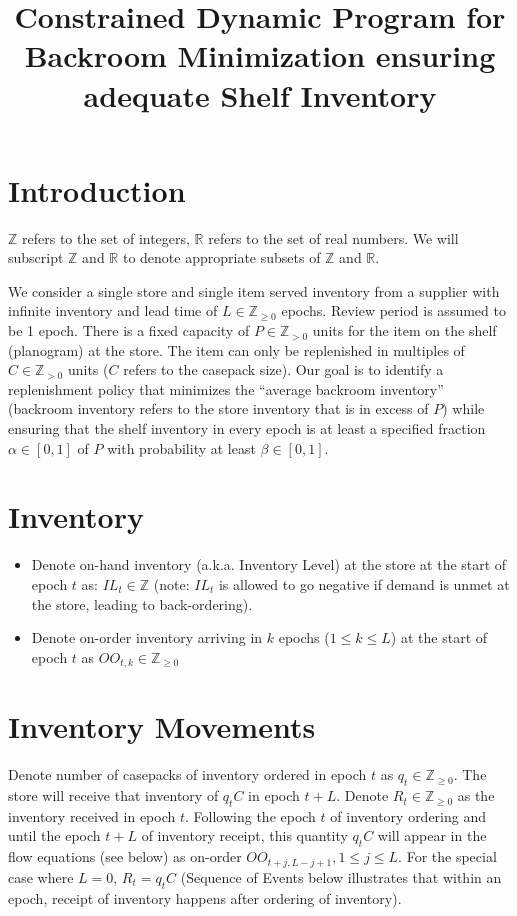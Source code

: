 \documentclass[12pt]{amsart}
\title{Constrained Dynamic Program for Backroom Minimization ensuring adequate Shelf Inventory}
\author{}
\date{} %
\begin{document}
\maketitle

\section{Introduction}

$\mathbb{Z}$ refers to the set of integers, $\mathbb{R}$ refers to the set of real numbers. We will subscript $\mathbb{Z}$ and $\mathbb{R}$ to denote appropriate subsets of $\mathbb{Z}$ and $\mathbb{R}$. 
 
We consider a single store and single item served inventory from a supplier with infinite inventory and lead time of $L \in \mathbb{Z}_{\geq 0}$ epochs. Review period is assumed to be 1 epoch. There is a fixed capacity of $P \in \mathbb{Z}_{> 0}$ units for the item on the shelf (planogram) at the store. The item can only be replenished in multiples of $C \in \mathbb{Z}_{> 0}$ units ($C$ refers to the casepack size). Our goal is to identify a replenishment policy that minimizes the ``average backroom inventory'' (backroom inventory refers to the store inventory that is in excess of $P$) while ensuring that the shelf inventory in every epoch is at least a specified fraction $\alpha \in [0,1]$ of $P$ with probability at least $\beta \in [0,1]$.

\section{Inventory}
\begin{itemize}
\item Denote on-hand inventory (a.k.a. Inventory Level) at the store at the start of epoch $t$ as: $IL_t \in \mathbb{Z}$ (note: $IL_t$ is allowed to go negative if demand is unmet at the store, leading to back-ordering).
\item Denote on-order inventory arriving in $k$ epochs ($1 \leq k \leq L$) at the start of epoch $t$ as $OO_{t,k} \in \mathbb{Z}_{\geq 0}$
\end{itemize}

\section{Inventory Movements}
Denote number of casepacks of inventory ordered in epoch $t$ as $q_t \in \mathbb{Z}_{\geq 0}$. The store will receive that inventory of $q_t  C$ in epoch $t + L$. Denote $R_t \in \mathbb{Z}_{\geq 0}$ as the inventory received in epoch $t$. Following the epoch $t$ of inventory ordering and until the epoch $t+L$ of inventory receipt, this quantity $q_t C$ will appear in the flow equations (see below) as on-order $OO_{t+j,L-j+1}, 1 \leq j \leq L$. For the special case where $L = 0$, $R_t = q_t C$ (Sequence of Events below illustrates that within an epoch, receipt of inventory happens after ordering of inventory).
\end{document}
